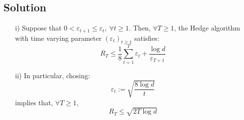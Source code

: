 \documentclass[12pt]{report}
\begin{document}
\subsection*{Solution}
\begin{theorema}{}{}
    \begin{itemize}
        \item[i)] Suppose that $0 < \varepsilon_{t+1} \leq \varepsilon_t, \ \forall t \geq 1$. Then, $\forall T \geq 1$, the Hedge algorithm with time varying parameter $\left(\varepsilon
        _t\right)_{t\geq 1}$ satisfies:
        \[
            R_T \leq \dfrac{1}{8} \sum\limits_{t=1}^T \varepsilon_t + \dfrac{\log d}{\varepsilon_{T+1}}
        \]
        \item[ii)] In particular, chosing:
        \[
           \varepsilon_t := \sqrt{\dfrac{8\log d}{t}} 
        \]
        implies that, $\forall T \geq 1$, 
        \[
            R_T \leq \sqrt{2T\log d}  
        \]
    \end{itemize}
\end{theorema}
\end{document}
